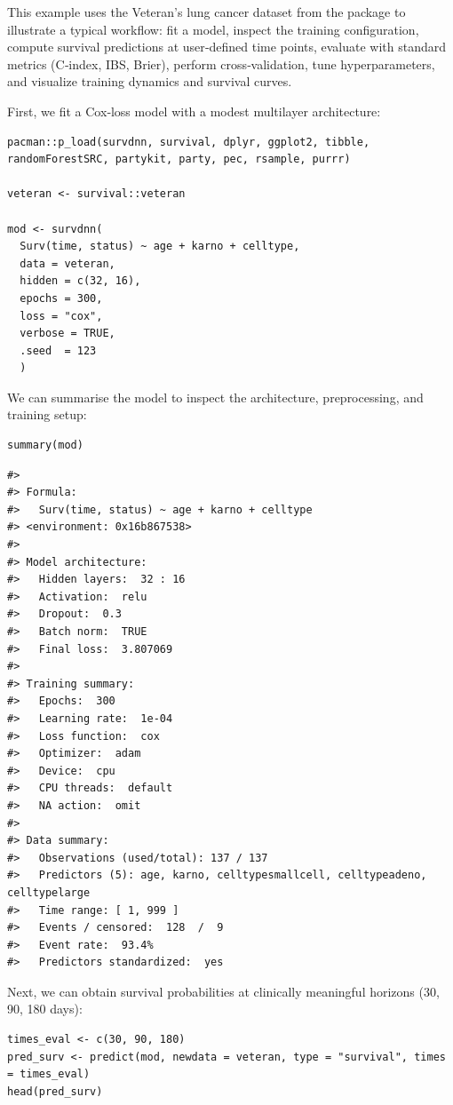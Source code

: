 This example uses the Veteran's lung cancer dataset from the  package \citep{survival-book} to illustrate a typical  workflow: fit a model, inspect the training configuration, compute survival predictions at user‑defined time points, evaluate with standard metrics (C‑index, IBS, Brier), perform cross‑validation, tune hyperparameters, and visualize training dynamics and survival curves.

First, we fit a Cox‑loss model with a modest multilayer architecture:

\begin{verbatim}
pacman::p_load(survdnn, survival, dplyr, ggplot2, tibble, randomForestSRC, partykit, party, pec, rsample, purrr)

veteran <- survival::veteran

mod <- survdnn(
  Surv(time, status) ~ age + karno + celltype,
  data = veteran,
  hidden = c(32, 16),
  epochs = 300,
  loss = "cox",
  verbose = TRUE,
  .seed  = 123
  )
\end{verbatim}

We can summarise the model to inspect the architecture, preprocessing, and training setup:

\begin{verbatim}
summary(mod)
\end{verbatim}

\begin{verbatim}
#> 
#> Formula:
#>   Surv(time, status) ~ age + karno + celltype
#> <environment: 0x16b867538>
#> 
#> Model architecture:
#>   Hidden layers:  32 : 16 
#>   Activation:  relu 
#>   Dropout:  0.3 
#>   Batch norm:  TRUE 
#>   Final loss:  3.807069 
#> 
#> Training summary:
#>   Epochs:  300 
#>   Learning rate:  1e-04 
#>   Loss function:  cox 
#>   Optimizer:  adam 
#>   Device:  cpu 
#>   CPU threads:  default 
#>   NA action:  omit 
#> 
#> Data summary:
#>   Observations (used/total): 137 / 137
#>   Predictors (5): age, karno, celltypesmallcell, celltypeadeno, celltypelarge
#>   Time range: [ 1, 999 ]
#>   Events / censored:  128  /  9 
#>   Event rate:  93.4% 
#>   Predictors standardized:  yes
\end{verbatim}

Next, we can obtain survival probabilities at clinically meaningful horizons (30, 90, 180 days):

\begin{verbatim}
times_eval <- c(30, 90, 180)
pred_surv <- predict(mod, newdata = veteran, type = "survival", times = times_eval)
head(pred_surv)
\end{verbatim}

